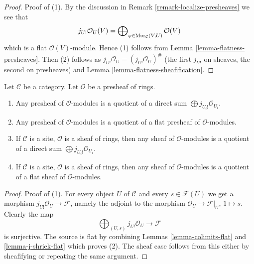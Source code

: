 \begin{proof}
Proof of (1). By the discussion in
Remark \ref{remark-localize-presheaves}
we see that
$$
j_{U!}\mathcal{O}_U(V)
=
\bigoplus\nolimits_{\varphi \in \mathop{\mathrm{Mor}}\nolimits_\mathcal{C}(V, U)}
\mathcal{O}(V)
$$
which is a flat $\mathcal{O}(V)$-module. Hence (1) follows from
Lemma \ref{lemma-flatness-presheaves}.
Then (2) follows as $j_{U!}\mathcal{O}_U = (j_{U!}\mathcal{O}_U)^\#$
(the first $j_{U!}$ on sheaves, the second on presheaves)
and Lemma \ref{lemma-flatness-sheafification}.
\end{proof}

\begin{lemma}
\label{lemma-module-quotient-flat}
Let $\mathcal{C}$ be a category.
Let $\mathcal{O}$ be a presheaf of rings.
\begin{enumerate}
\item Any presheaf of $\mathcal{O}$-modules is a quotient of
a direct sum $\bigoplus j_{U_i!}\mathcal{O}_{U_i}$.
\item Any presheaf of $\mathcal{O}$-modules is a quotient of
a flat presheaf of $\mathcal{O}$-modules.
\item If $\mathcal{C}$ is a site, $\mathcal{O}$ is a sheaf of rings,
then any sheaf of $\mathcal{O}$-modules is a quotient of
a direct sum $\bigoplus j_{U_i!}\mathcal{O}_{U_i}$.
\item If $\mathcal{C}$ is a site, $\mathcal{O}$ is a sheaf of rings,
then any sheaf of $\mathcal{O}$-modules is a quotient of
a flat sheaf of $\mathcal{O}$-modules.
\end{enumerate}
\end{lemma}

\begin{proof}
Proof of (1). For every object $U$ of $\mathcal{C}$ and every
$s \in \mathcal{F}(U)$ we get a morphism
$j_{U!}\mathcal{O}_U \to \mathcal{F}$, namely the adjoint to
the morphism $\mathcal{O}_U \to \mathcal{F}|_U$, $1 \mapsto s$.
Clearly the map
$$
\bigoplus\nolimits_{(U, s)} j_{U!}\mathcal{O}_U
\longrightarrow
\mathcal{F}
$$
is surjective. The source is flat by combining Lemmas
\ref{lemma-colimits-flat} and \ref{lemma-j-shriek-flat}
which proves (2). The sheaf case follows from this either by
sheafifying or repeating the same argument.
\end{proof}

